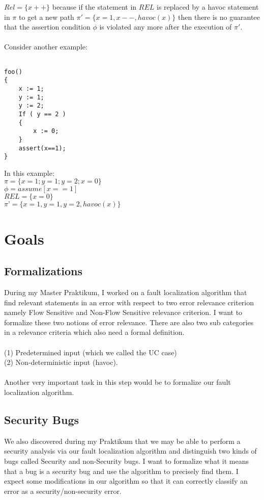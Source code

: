 \documentclass{article}
\begin{document}
$Rel =\{x++\}$ because if the statement in $REL$ is replaced by a havoc statement in $\pi$ to get a new path $\pi' =\{x=1, x--, havoc(x)\}$ then there is no guarantee that the assertion condition $\phi$ is violated any more after the execution of $\pi'$.
\\
\\
Consider another example:
\begin{lstlisting}

foo()
{
	x := 1;
	y := 1;
	y := 2;
	If ( y == 2 )
	{
		x := 0;
	}
	assert(x==1);
}

\end{lstlisting}
In this example: \\
$\pi = \{ x=1; y=1; y=2; x=0 \} $\\
$\phi = assume[x==1]$\\
$REL = \{ x=0 \}$ \\
$\pi’ = \{x=1, y=1, y=2, havoc(x)\}$
\newpage

\section{Goals}
\subsection{Formalizations}
During my Master Praktikum, I worked on a fault localization algorithm that find relevant statements in an error with respect to two error relevance criterion namely Flow Sensitive and Non-Flow Sensitive relevance criterion. I want to formalize these two notions of error relevance. There are also two sub categories in a relevance criteria which also need a formal definition.\\ 
\\(1) Predetermined input (which we called the UC case) 
\\ (2) Non-deterministic input (havoc).\\
\\Another very important task in this step would be to formalize our fault localization algorithm.
\subsection{Security Bugs}
We also discovered during my Praktikum that we may be able to perform a security analysis via our fault localization algorithm and distinguish two kinds of bugs called Security and non-Security bugs. I want to formalize what it means that a bug is a security bug and use the algorithm to precisely find them. I expect some modifications in our algorithm so that it can correctly classify an error as a security/non-security error.
\end{document}

